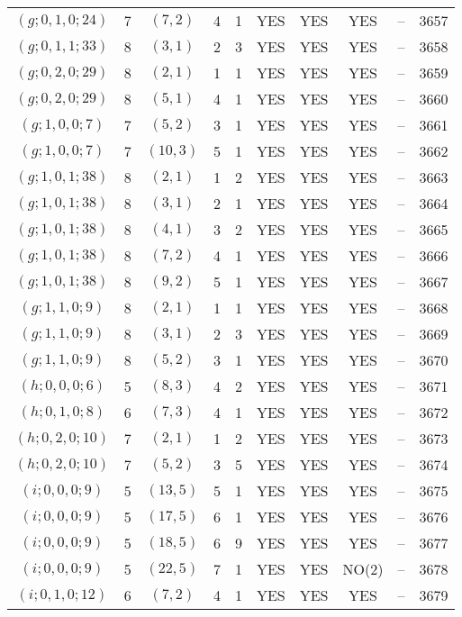 \begin{longtable}{|c|c|c|c|c|c|c|c|c|c|}
$(g; 0, 1, 0; 24)$ & 7 & $(7, 2)$ & 4 & 1 & YES & YES & YES & -- & 3657\\
$(g; 0, 1, 1; 33)$ & 8 & $(3, 1)$ & 2 & 3 & YES & YES & YES & -- & 3658\\
$(g; 0, 2, 0; 29)$ & 8 & $(2, 1)$ & 1 & 1 & YES & YES & YES & -- & 3659\\
$(g; 0, 2, 0; 29)$ & 8 & $(5, 1)$ & 4 & 1 & YES & YES & YES & -- & 3660\\
$(g; 1, 0, 0; 7)$ & 7 & $(5, 2)$ & 3 & 1 & YES & YES & YES & -- & 3661\\
$(g; 1, 0, 0; 7)$ & 7 & $(10, 3)$ & 5 & 1 & YES & YES & YES & -- & 3662\\
$(g; 1, 0, 1; 38)$ & 8 & $(2, 1)$ & 1 & 2 & YES & YES & YES & -- & 3663\\
$(g; 1, 0, 1; 38)$ & 8 & $(3, 1)$ & 2 & 1 & YES & YES & YES & -- & 3664\\
$(g; 1, 0, 1; 38)$ & 8 & $(4, 1)$ & 3 & 2 & YES & YES & YES & -- & 3665\\
$(g; 1, 0, 1; 38)$ & 8 & $(7, 2)$ & 4 & 1 & YES & YES & YES & -- & 3666\\
$(g; 1, 0, 1; 38)$ & 8 & $(9, 2)$ & 5 & 1 & YES & YES & YES & -- & 3667\\
$(g; 1, 1, 0; 9)$ & 8 & $(2, 1)$ & 1 & 1 & YES & YES & YES & -- & 3668\\
$(g; 1, 1, 0; 9)$ & 8 & $(3, 1)$ & 2 & 3 & YES & YES & YES & -- & 3669\\
$(g; 1, 1, 0; 9)$ & 8 & $(5, 2)$ & 3 & 1 & YES & YES & YES & -- & 3670\\
$(h; 0, 0, 0; 6)$ & 5 & $(8, 3)$ & 4 & 2 & YES & YES & YES & -- & 3671\\
$(h; 0, 1, 0; 8)$ & 6 & $(7, 3)$ & 4 & 1 & YES & YES & YES & -- & 3672\\
$(h; 0, 2, 0; 10)$ & 7 & $(2, 1)$ & 1 & 2 & YES & YES & YES & -- & 3673\\
$(h; 0, 2, 0; 10)$ & 7 & $(5, 2)$ & 3 & 5 & YES & YES & YES & -- & 3674\\
$(i; 0, 0, 0; 9)$ & 5 & $(13, 5)$ & 5 & 1 & YES & YES & YES & -- & 3675\\
$(i; 0, 0, 0; 9)$ & 5 & $(17, 5)$ & 6 & 1 & YES & YES & YES & -- & 3676\\
$(i; 0, 0, 0; 9)$ & 5 & $(18, 5)$ & 6 & 9 & YES & YES & YES & -- & 3677\\
$(i; 0, 0, 0; 9)$ & 5 & $(22, 5)$ & 7 & 1 & YES & YES & NO(2) & -- & 3678\\
$(i; 0, 1, 0; 12)$ & 6 & $(7, 2)$ & 4 & 1 & YES & YES & YES & -- & 3679\\

\end{longtable}
